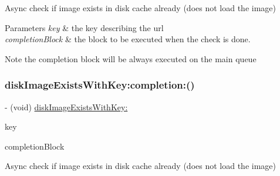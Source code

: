 Async check if image exists in disk cache already (does not load the image)


\begin{DoxyParams}{Parameters}
{\em key} & the key describing the url \\
\hline
{\em completion\+Block} & the block to be executed when the check is done. \\
\hline
\end{DoxyParams}
\begin{DoxyNote}{Note}
the completion block will be always executed on the main queue 
\end{DoxyNote}
\mbox{\label{interface_s_d_image_cache_a2baefc1300fcd3c57a25b5326dda8834}} 
\subsubsection{\texorpdfstring{disk\+Image\+Exists\+With\+Key\+:completion\+:()}{diskImageExistsWithKey:completion:()}\hspace{0.1cm}{\footnotesize\ttfamily [3/3]}}
{\footnotesize\ttfamily -\/ (void) \mbox{\hyperlink{interface_s_d_image_cache_a67feea7b5568f427dfcf4f380abc1ba7}{disk\+Image\+Exists\+With\+Key\+:}} \begin{DoxyParamCaption}\item[{(N\+S\+String $\ast$)}]{key }\item[{completion:(S\+D\+Web\+Image\+Check\+Cache\+Completion\+Block)}]{completion\+Block }\end{DoxyParamCaption}}

Async check if image exists in disk cache already (does not load the image)



